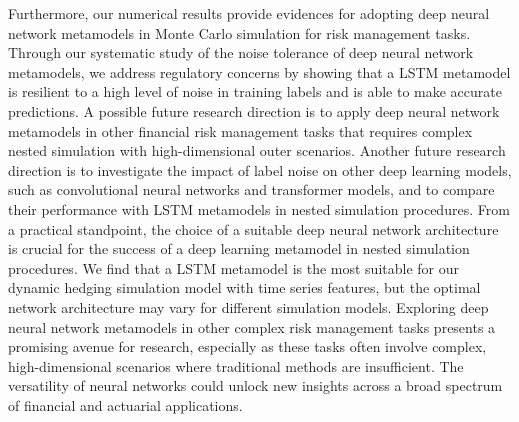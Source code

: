 \documentclass{article}
\begin{document}
Furthermore, our numerical results provide evidences for adopting deep neural network metamodels in Monte Carlo simulation for risk management tasks.
Through our systematic study of the noise tolerance of deep neural network metamodels, we address regulatory concerns by showing that a LSTM metamodel is resilient to a high level of noise in training labels and is able to make accurate predictions.
A possible future research direction is to apply deep neural network metamodels in other financial risk management tasks that requires complex nested simulation with high-dimensional outer scenarios.
Another future research direction is to investigate the impact of label noise on other deep learning models, such as convolutional neural networks and transformer models, and to compare their performance with LSTM metamodels in nested simulation procedures. 
From a practical standpoint, the choice of a suitable deep neural network architecture is crucial for the success of a deep learning metamodel in nested simulation procedures.
We find that a LSTM metamodel is the most suitable for our dynamic hedging simulation model with time series features, but the optimal network architecture may vary for different simulation models.
Exploring deep neural network metamodels in other complex risk management tasks presents a promising avenue for research, especially as these tasks often involve complex, high-dimensional scenarios where traditional methods are insufficient. 
The versatility of neural networks could unlock new insights across a broad spectrum of financial and actuarial applications.


\newpage

\footnotesize

\end{document}
